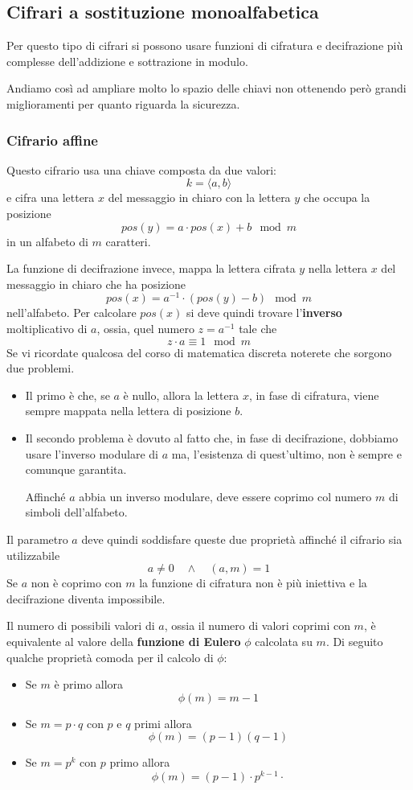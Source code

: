 \subsection{Cifrari a sostituzione monoalfabetica}
Per questo tipo di cifrari si possono usare funzioni di cifratura e decifrazione pi\`u complesse dell'addizione e
sottrazione in modulo.

Andiamo cos\`i ad ampliare molto lo spazio delle chiavi non ottenendo per\`o grandi  miglioramenti per quanto
riguarda la sicurezza.

\subsubsection{Cifrario affine}
Questo cifrario usa una chiave composta da due valori:
\[ k = \langle a, b \rangle \]
e cifra una lettera $x$ del messaggio in chiaro con la lettera $y$ che occupa la posizione
\[ pos(y) = a \cdot pos(x) + b \mod{m} \]
in un alfabeto di $m$ caratteri.

La funzione di decifrazione invece, mappa la lettera cifrata $y$ nella lettera $x$ del messaggio in chiaro che ha
posizione
\[ pos(x) = a^{-1} \cdot (pos(y) - b) \mod{m} \]
nell'alfabeto. Per calcolare $pos(x)$ si deve quindi trovare l'\textbf{inverso} moltiplicativo di $a$, ossia, quel
numero $z = a^{-1}$ tale che
\[ z \cdot a \equiv 1 \mod{m} \]
Se vi ricordate qualcosa del corso di matematica discreta noterete che sorgono due problemi.
\begin{itemize}
	\item Il primo \`e che, se $a$ \`e nullo, allora la lettera $x$, in fase di cifratura, viene sempre mappata nella
	      lettera di posizione $b$.
	\item Il secondo problema \`e dovuto al fatto che, in fase di decifrazione, dobbiamo usare l'inverso modulare di $a$
	      ma, l'esistenza di quest'ultimo, non \`e sempre e comunque garantita.

	      Affinch\'e $a$ abbia un inverso modulare, deve essere coprimo col numero $m$ di simboli dell'alfabeto.
\end{itemize}
Il parametro $a$ deve quindi soddisfare queste due propriet\`a affinch\'e il cifrario sia utilizzabile
\[ a \neq 0 \quad \wedge \quad (a, m) = 1 \]
Se $a$ non \`e coprimo con $m$ la funzione di cifratura non \`e pi\`u iniettiva e la decifrazione diventa impossibile.

Il numero di possibili valori di $a$, ossia il numero di valori coprimi con $m$, \`e equivalente al valore della
\textbf{funzione di Eulero} $\phi$ calcolata su $m$. Di seguito qualche propriet\`a comoda per il calcolo di $\phi$:
\begin{itemize}
	\item Se $m$ \`e primo allora
	      \[ \phi(m) = m - 1 \]
	\item Se $m = p \cdot q$ con $p$ e $q$ primi allora
	      \[ \phi(m) = (p - 1)(q - 1) \]
	\item Se $m = p^{k}$ con $p$ primo allora
	      \[ \phi(m) = (p - 1) \cdot p^{k-1} \cdot  \]
\end{itemize}

